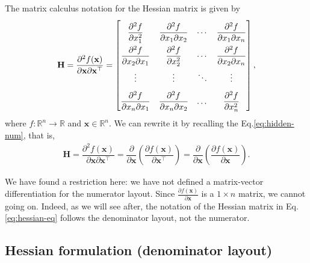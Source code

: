 \documentclass{article}
\begin{document}
The matrix calculus notation for the Hessian matrix is given by
\begin{align}
    \label{eq:hessian-eq}
    \mathbf{H} = \dfrac{\partial^{2} f(\mathbf{x})}{\partial \mathbf{x} \partial \mathbf{x}^\top} = \renewcommand{\arraystretch}{2.2}\begin{bmatrix}
        \dfrac{\partial^{2} f}{\partial x_1^2} & \dfrac{\partial^{2} f}{\partial x_1 \partial x_2} & \cdots & \dfrac{\partial^{2} f}{\partial x_1 \partial x_n} \\
        \dfrac{\partial^{2} f}{\partial x_2 \partial x_1} & \dfrac{\partial^{2} f}{\partial x_2^2} & \cdots & \dfrac{\partial^{2} f}{\partial x_2 \partial x_n} \\
        \vdots & \vdots & \ddots & \vdots \\
        \dfrac{\partial^{2} f}{\partial x_n \partial x_1} & \dfrac{\partial^{2} f}{\partial x_n \partial x_2} & \dots & \dfrac{\partial^{2} f}{\partial x_n^2}
    \end{bmatrix},
\end{align}
where \(f: \mathbb{R}^{n} \rightarrow \mathbb{R}\) and \(\mathbf{x} \in \mathbb{R}^{n}\). We can rewrite it by recalling the Eq.\eqref{eq:hidden-num}, that is,
\begin{align}
    \mathbf{H} = \dfrac{\partial^{2} f(\mathbf{x})}{\partial \mathbf{x} \partial \mathbf{x}^\top} = \dfrac{\partial }{\partial \mathbf{x}}\left( \dfrac{\partial f(\mathbf{x})}{\partial \mathbf{x}^\top} \right) = \dfrac{\partial }{\partial \mathbf{x}}\left( \dfrac{\partial f(\mathbf{x})}{\partial \mathbf{x}} \right).
\end{align}

We have found a restriction here: we have not defined a matrix-vector differentiation for the numerator layout. Since \(\frac{\partial f(\mathbf{x})}{\partial \mathbf{x}}\) is a \(1\times n\) matrix, we cannot going on. Indeed, as we will see after, the notation of the Hessian matrix in Eq.\eqref{eq:hessian-eq} follows the denominator layout, not the numerator.

\subsection{Hessian formulation (denominator layout)}
\end{document}

